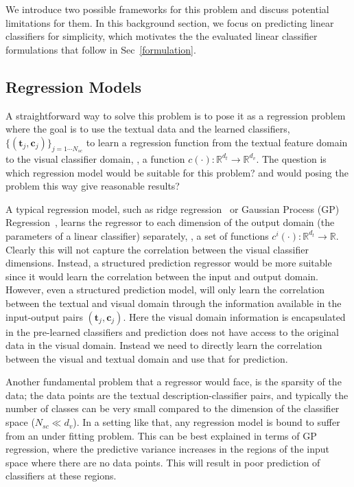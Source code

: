 We introduce two possible frameworks for this problem and discuss potential limitations for them. In this background section,  we focus on predicting linear classifiers for simplicity, which motivates the the evaluated linear classifier formulations that follow in Sec~\ref{formulation}. 

\subsection{Regression Models}
A straightforward way to solve this problem is to pose it as a regression problem where the goal is to use the textual data and the learned classifiers, $\{(\mathbf{t}_j,\mathbf{c}_j) \}_{j=1\cdots N_{sc}}$ to learn a regression function from the textual feature domain to the visual classifier domain, \ie, a function $c(\cdot) : \mathbb{R}^{d_t} \rightarrow \mathbb{R}^{d_v} $.  The question is which regression model would be suitable for this problem? and would posing the problem this way give reasonable results?

A typical regression model, such as ridge regression~\cite{ridgeReg70} or Gaussian Process (GP) Regression~\cite{Rasmussen:2005}, learns the regressor to each dimension of the output domain (the parameters of a linear classifier) separately, \ie,  a set of functions $c^i(\cdot) : \mathbb{R}^{d_t} \rightarrow \mathbb{R} $. Clearly this will not capture the correlation between the visual classifier dimensions. Instead, a structured prediction regressor would be more suitable since it would learn the correlation between the input and output domain. However, even a structured prediction model, will only learn the correlation between the textual and visual domain through the information available in the input-output pairs  $(\mathbf{t}_j,\mathbf{c}_j)$.  Here the visual domain information is encapsulated in the pre-learned classifiers and prediction does not have access to the original data in the visual domain. Instead we need to directly learn the correlation between the visual and textual domain and use that for prediction.

Another fundamental problem  that a regressor would face, is the sparsity of the data; the data points are the textual description-classifier pairs, and typically the number of classes can be very small compared to the dimension of the classifier space (\ie $N_{sc} \ll d_v$). In a setting like that, any regression model is bound to suffer from an under fitting problem. This can be best explained in terms of GP regression, where the predictive variance increases in the regions of the input space where there are no data points. This will result in  poor prediction of classifiers at these regions. 

